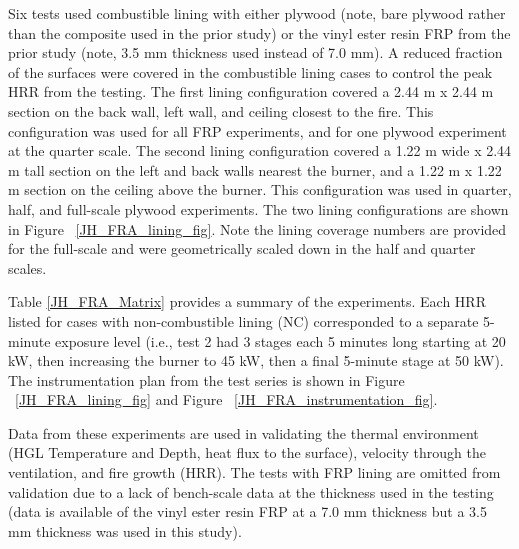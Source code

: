 Six tests used combustible lining with either plywood (note, bare plywood rather than the composite used in the prior study) or the vinyl ester resin FRP from the prior study (note, 3.5 mm thickness used instead of 7.0 mm).
A reduced fraction of the surfaces were covered in the combustible lining cases to control the peak HRR from the testing.
The first lining configuration covered a 2.44 m x 2.44 m section on the back wall, left wall, and ceiling closest to the fire.
This configuration was used for all FRP experiments, and for one plywood experiment at the quarter scale.
The second lining configuration covered a 1.22 m wide x 2.44 m tall section on the left and back walls nearest the burner, and a 1.22 m x 1.22 m section on the ceiling above the burner.
This configuration was used in quarter, half, and full-scale plywood experiments.
The two lining configurations are shown in Figure ~\ref{JH_FRA_lining_fig}.
Note the lining coverage numbers are provided for the full-scale and were geometrically scaled down in the half and quarter scales.

Table \ref{JH_FRA_Matrix} provides a summary of the experiments.
Each HRR listed for cases with non-combustible lining (NC) corresponded to a separate 5-minute exposure level (i.e., test 2 had 3 stages each 5 minutes long starting at 20 kW, then increasing the burner to 45 kW, then a final 5-minute stage at 50 kW).
The instrumentation plan from the test series is shown in Figure ~\ref{JH_FRA_lining_fig} and Figure ~\ref{JH_FRA_instrumentation_fig}.

Data from these experiments are used in validating the thermal environment (HGL Temperature and Depth, heat flux to the surface), velocity through the ventilation, and fire growth (HRR).
The tests with FRP lining are omitted from validation due to a lack of bench-scale data at the thickness used in the testing (data is available of the vinyl ester resin FRP at a 7.0 mm thickness but a 3.5 mm thickness was used in this study).

